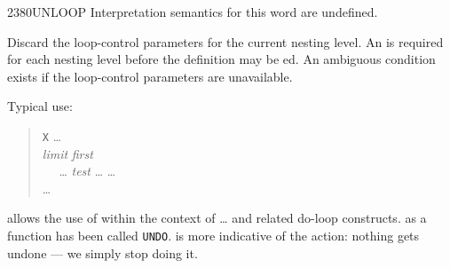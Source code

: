 \begin{worddef}{2380}{UNLOOP}
\interpret
	Interpretation semantics for this word are undefined.

\execute
	\stack{}{}

	Discard the loop-control parameters for the current nesting
	level. An  is required for each nesting level
	before the definition may be ed. An ambiguous
	condition exists if the loop-control parameters are unavailable.


	\begin{rationale} %
		Typical use:
		\begin{quote}
			\word{:} \texttt{X} {\ldots} \\
			\tab \emph{limit} \emph{first}  \\
			\tab~~ {\ldots} \emph{test} 
				{\ldots}    {\ldots} \\
			\tab {} {\ldots} \\
			\word{;}
		\end{quote}

		 allows the use of  within the context
		of  {\ldots}  and related do-loop constructs.
		 as a function has been called \texttt{UNDO}.
		 is more indicative of the action: nothing gets
		undone --- we simply stop doing it.
	\end{rationale}

	\begin{testing} %
		 \\
		 \\
		 \\
	\end{testing}
\end{worddef}


